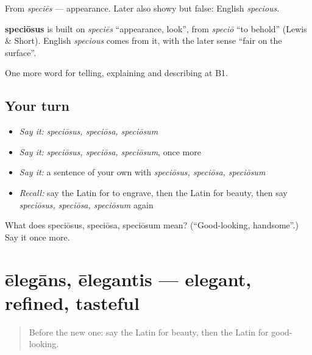 From \emph{speciēs} — appearance. Later also showy but false: English \emph{specious}.

\begin{cousinweb}
\textbf{speciōsus} is built on \emph{speciēs} \textquotedblleft{}appearance, look\textquotedblright{}, from \emph{speciō} \textquotedblleft{}to behold\textquotedblright{} (Lewis \& Short). English \emph{specious} comes from it, with the later sense \textquotedblleft{}fair on the surface\textquotedblright{}.
\end{cousinweb}

\begin{grammarlens}[title={What you've built}]
One more word for telling, explaining and describing at B1.
\end{grammarlens}

\subsection*{Your turn}
\begin{itemize}
\raggedright
  \item \emph{Say it:} \emph{speciōsus, speciōsa, speciōsum}
  \item \emph{Say it:} \emph{speciōsus, speciōsa, speciōsum}, once more
  \item \emph{Say it:} a sentence of your own with \emph{speciōsus, speciōsa, speciōsum}
  \item \emph{Recall:} say the Latin for to engrave, then the Latin for beauty, then say \emph{speciōsus, speciōsa, speciōsum} again
\end{itemize}

\begin{tcolorbox}[breakable,colback=teal!4,colframe=teal!35!black,title={Before you move on}]
What does speciōsus, speciōsa, speciōsum mean? (\textquotedblleft{}Good-looking, handsome\textquotedblright{}.) Say it once more.
\end{tcolorbox}
\section[ēlegāns, ēlegantis]{ēlegāns, ēlegantis — elegant, refined, tasteful}

\label{lesson:LA-C548-elegans}



\begin{quote}
Before the new one: say the Latin for beauty, then the Latin for good-looking.
\end{quote}

